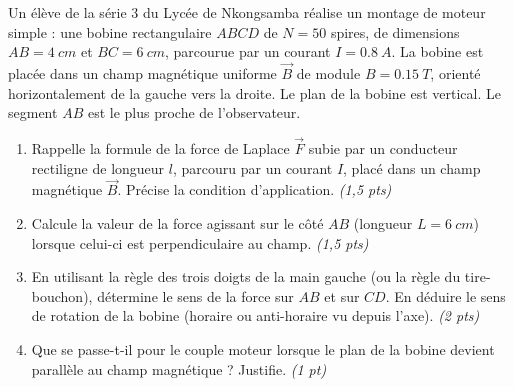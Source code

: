 \documentclass[11pt]{article}
\begin{document}
\begin{exercice}
Un élève de la série 3 du Lycée de Nkongsamba réalise un montage de moteur simple : une bobine rectangulaire $ABCD$ de $N = 50$ spires, de dimensions $AB = \SI{4}{cm}$ et $BC = \SI{6}{cm}$, parcourue par un courant $I = \SI{0,8}{A}$. La bobine est placée dans un champ magnétique uniforme $\vec{B}$ de module $B = \SI{0,15}{T}$, orienté horizontalement de la gauche vers la droite. Le plan de la bobine est vertical. Le segment $AB$ est le plus proche de l'observateur.

\begin{enumerate}
    \item Rappelle la formule de la force de Laplace $\vec{F}$ subie par un conducteur rectiligne de longueur $l$, parcouru par un courant $I$, placé dans un champ magnétique $\vec{B}$. Précise la condition d'application. \textit{(1,5 pts)}
    \item Calcule la valeur de la force agissant sur le côté $AB$ (longueur $L = \SI{6}{cm}$) lorsque celui-ci est perpendiculaire au champ. \textit{(1,5 pts)}
    \item En utilisant la règle des trois doigts de la main gauche (ou la règle du tire-bouchon), détermine le sens de la force sur $AB$ et sur $CD$. En déduire le sens de rotation de la bobine (horaire ou anti-horaire vu depuis l'axe). \textit{(2 pts)}
    \item Que se passe-t-il pour le couple moteur lorsque le plan de la bobine devient parallèle au champ magnétique ? Justifie. \textit{(1 pt)}
\end{enumerate}
\end{exercice}
\end{document}
